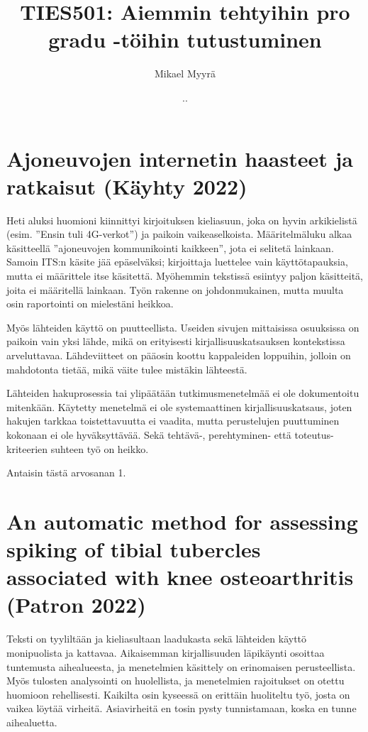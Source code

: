 \documentclass{article}
\title{TIES501: Aiemmin tehtyihin pro gradu -töihin tutustuminen}
\author{Mikael Myyrä}
\date{\number\day.\number\month.\number\year}
\begin{document}
\maketitle

\section*{Ajoneuvojen internetin haasteet ja ratkaisut (Käyhty 2022)}

Heti aluksi huomioni kiinnittyi kirjoituksen kieliasuun, joka on hyvin
arkikielistä (esim. ''Ensin tuli 4G-verkot'') ja paikoin vaikeaselkoista.
Määritelmäluku alkaa käsitteellä ''ajoneuvojen kommunikointi kaikkeen'', jota
ei selitetä lainkaan. Samoin ITS:n käsite jää epäselväksi; kirjoittaja
luettelee vain käyttötapauksia, mutta ei määrittele itse käsitettä. Myöhemmin
tekstissä esiintyy paljon käsitteitä, joita ei määritellä lainkaan. Työn
rakenne on johdonmukainen, mutta muulta osin raportointi on mielestäni heikkoa.

Myös lähteiden käyttö on puutteellista. Useiden sivujen mittaisissa osuuksissa
on paikoin vain yksi lähde, mikä on erityisesti kirjallisuuskatsauksen
kontekstissa arveluttavaa. Lähdeviitteet on pääosin koottu kappaleiden
loppuihin, jolloin on mahdotonta tietää, mikä väite tulee mistäkin lähteestä.

Lähteiden hakuprosessia tai ylipäätään tutkimusmenetelmää ei ole dokumentoitu
mitenkään. Käytetty menetelmä ei ole systemaattinen kirjallisuuskatsaus, joten
hakujen tarkkaa toistettavuutta ei vaadita, mutta perustelujen puuttuminen
kokonaan ei ole hyväksyttävää. Sekä tehtävä-, perehtymi\-nen- että
toteutus-kriteerien suhteen työ on heikko.

Antaisin tästä arvosanan 1.

\section*{An automatic method for assessing spiking of tibial
tubercles associated with knee osteoarthritis (Patron 2022)}

Teksti on tyyliltään ja kieliasultaan laadukasta sekä lähteiden käyttö
monipuolista ja kattavaa. Aikaisemman kirjallisuuden läpikäynti osoittaa
tuntemusta aihealueesta, ja menetelmien käsittely on erinomaisen
perusteellista. Myös tulosten analysointi on huolellista, ja menetelmien
rajoitukset on otettu huomioon rehellisesti. Kaikilta osin kyseessä on erittäin
huoliteltu työ, josta on vaikea löytää virheitä. Asiavirheitä en tosin pysty
tunnistamaan, koska en tunne aihealuetta.
\end{document}
